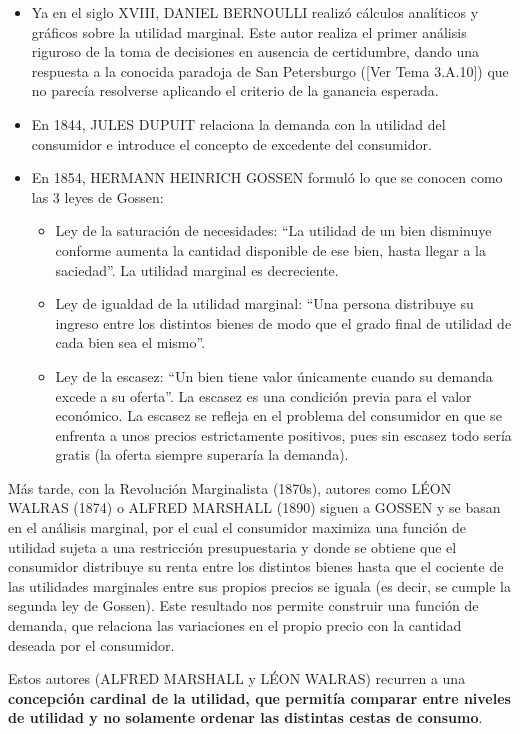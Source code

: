 \documentclass[10pt,a4paper]{article}
\newcommand{\authorfont}[1]{{\fontfamily{EBGaramond-TLF}\selectfont #1}}
\begin{document}
\begin{itemize}
    \item Ya en el siglo XVIII, DANIEL BERNOULLI realizó cálculos analíticos y gráficos sobre la utilidad marginal. Este autor realiza el primer análisis riguroso de la toma de decisiones en ausencia de certidumbre, dando una respuesta a la conocida paradoja de San Petersburgo ([\authorfont{Ver Tema 3.A.10}]) que no parecía resolverse aplicando el criterio de la ganancia esperada.
    \item En 1844, JULES DUPUIT relaciona la demanda con la utilidad del consumidor e introduce el concepto de excedente del consumidor.
    \item En 1854, HERMANN HEINRICH GOSSEN formuló lo que se conocen como las 3 leyes de Gossen:
    \begin{itemize}
        \item Ley de la saturación de necesidades: ``La utilidad de un bien disminuye conforme aumenta la cantidad disponible de ese bien, hasta llegar a la saciedad''. La utilidad marginal es decreciente.
        \item Ley de igualdad de la utilidad marginal: ``Una persona distribuye su ingreso entre los distintos bienes de modo que el grado final de utilidad de cada bien sea el mismo''.
        \item Ley de la escasez: ``Un bien tiene valor únicamente cuando su demanda excede a su oferta''. La escasez es una condición previa para el valor económico. La escasez se refleja en el problema del consumidor en que se enfrenta a unos precios estrictamente positivos, pues sin escasez todo sería gratis (la oferta siempre superaría la demanda).
    \end{itemize}
\end{itemize}

Más tarde, con la Revolución Marginalista (1870s), autores como LÉON WALRAS (1874) o ALFRED MARSHALL (1890) siguen a GOSSEN y se basan en el análisis marginal, por el cual el consumidor maximiza una función de utilidad sujeta a una restricción presupuestaria y donde se obtiene que el consumidor distribuye su renta entre los distintos bienes hasta que el cociente de las utilidades marginales entre sus propios precios se iguala (es decir, se cumple la segunda ley de Gossen). Este resultado nos permite construir una función de demanda, que relaciona las variaciones en el propio precio con la cantidad deseada por el consumidor.

Estos autores (ALFRED MARSHALL y LÉON WALRAS) recurren a una \textbf{concepción cardinal de la utilidad, que permitía comparar entre niveles de utilidad y no solamente ordenar las distintas cestas de consumo}.
\end{document}
